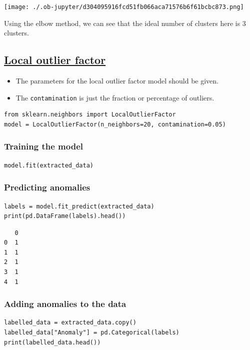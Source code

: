 \documentclass[11pt]{article}
\begin{document}
\begin{center}
\texttt{[image: ./.ob-jupyter/d304095916fcd51fb066aca71576b6f61bcbc873.png]}
\label{org2c61ccd}
\end{center}

Using the elbow method, we can see that the ideal number of clusters here is 3 clusters.

 \newpage
\subsection{\href{https://scikit-learn.org/stable/modules/generated/sklearn.neighbors.LocalOutlierFactor.html}{Local outlier factor}}
\label{sec:org451fc03}
\begin{itemize}
\item The parameters for the local outlier factor model should be given.
\item The \texttt{contamination} is just the fraction or percentage of outliers.
\end{itemize}
\begin{verbatim}
from sklearn.neighbors import LocalOutlierFactor
model = LocalOutlierFactor(n_neighbors=20, contamination=0.05)
\end{verbatim}
\subsubsection{Training the model}
\label{sec:org6ba6bb2}
\begin{verbatim}
model.fit(extracted_data)
\end{verbatim}
\subsubsection{Predicting anomalies}
\label{sec:org6ca04a7}
\begin{verbatim}
labels = model.fit_predict(extracted_data)
print(pd.DataFrame(labels).head())
\end{verbatim}

\label{org41c67ab}
\begin{verbatim}
   0
0  1
1  1
2  1
3  1
4  1
\end{verbatim}
\subsubsection{Adding anomalies to the data}
\label{sec:org0aedb30}
\begin{verbatim}
labelled_data = extracted_data.copy()
labelled_data["Anomaly"] = pd.Categorical(labels)
print(labelled_data.head())
\end{verbatim}
\end{document}
